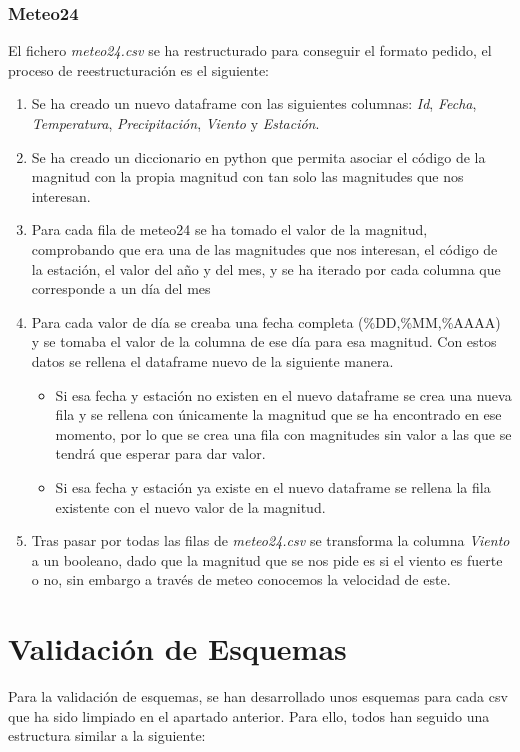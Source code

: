 \documentclass[]{article}
\begin{document}
\subsubsection{Meteo24}
\label{subsubsec:preprocessmeteo}
El fichero \textit{meteo24.csv} se ha restructurado para conseguir el formato pedido, el proceso de reestructuración es el siguiente:

\begin{enumerate}
    \item Se ha creado un nuevo dataframe con las siguientes columnas: \textit{Id}, \textit{Fecha}, \textit{Temperatura}, \textit{Precipitación}, \textit{Viento} y \textit{Estación}.
    \item Se ha creado un diccionario en python que permita asociar el código de la magnitud con la propia magnitud con tan solo las magnitudes que nos interesan.
    \item Para cada fila de meteo24 se ha tomado el valor de la magnitud, comprobando que era una de las magnitudes que nos interesan, el código de la estación, el valor del año y del mes, y se ha iterado por cada columna que corresponde a un día del mes
    \item Para cada valor de día se creaba una fecha completa (\%DD,\%MM,\%AAAA) y se tomaba el valor de la columna de ese día para esa magnitud. Con estos datos se rellena el dataframe nuevo de la siguiente manera.
    \begin{itemize}
        \item Si esa fecha y estación no existen en el nuevo dataframe se crea una nueva fila y se rellena con únicamente la magnitud que se ha encontrado en ese momento, por lo que se crea una fila con magnitudes sin valor a las que se tendrá que esperar para dar valor.
        \item Si esa fecha y estación ya existe en el nuevo dataframe se rellena la fila existente con el nuevo valor de la magnitud.
    \end{itemize}
    \item Tras pasar por todas las filas de \textit{meteo24.csv} se transforma la columna \textit{Viento} a un booleano, dado que la magnitud que se nos pide es si el viento es fuerte o no, sin embargo a través de meteo conocemos la velocidad de este.
\end{enumerate}

\newpage
\section{Validación de Esquemas}
\label{sec:validacion}
Para la validación de esquemas, se han desarrollado unos esquemas para cada csv que ha sido limpiado en el apartado anterior. Para ello, todos han seguido una estructura similar a la siguiente:
\end{document}
